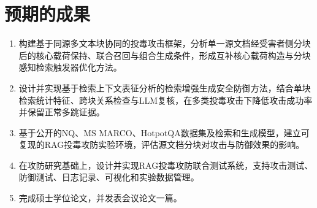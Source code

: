 \section{预期的成果}

\begin{enumerate}
  \item 构建基于同源多文本块协同的投毒攻击框架，分析单一源文档经受害者侧分块后的核心载荷保持、联合召回与组合生成条件，形成互补核心载荷构造与分块感知检索触发器优化方法。
  \item 设计并实现基于检索上下文表征分析的检索增强生成安全防御方法，结合单块检索统计特征、跨块关系检查与LLM复核，在多类投毒攻击下降低攻击成功率并保留正常多跳证据。
  \item 基于公开的NQ、MS MARCO、HotpotQA数据集及检索和生成模型，建立可复现的RAG投毒攻防实验环境，评估源文档分块对攻击与防御效果的影响。
  \item 在攻防研究基础上，设计并实现RAG投毒攻防联合测试系统，支持攻击测试、防御测试、日志记录、可视化和实验数据管理。
  \item 完成硕士学位论文，并发表会议论文一篇。
\end{enumerate}
